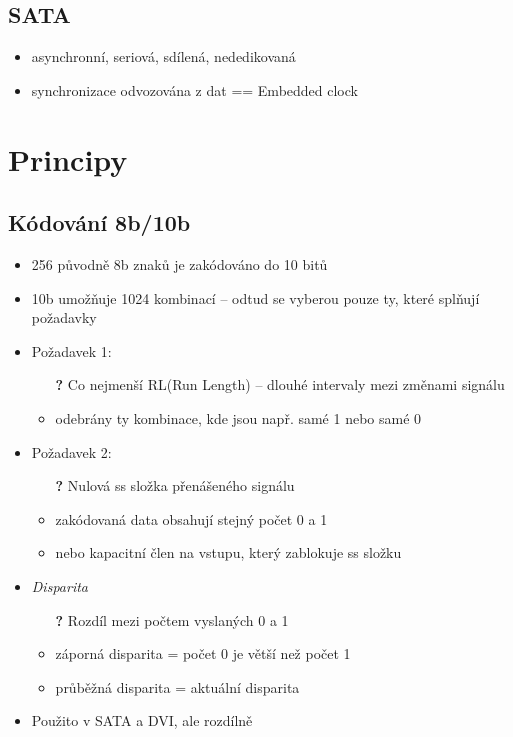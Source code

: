 \documentclass[a5paper,10pt]{article}
\begin{document}
\subsection{SATA}
\begin{itemize}
	\item asynchronní, seriová, sdílená, nededikovaná
	\item synchronizace odvozována z dat == Embedded clock
\end{itemize}



\newpage
\section{Principy}
\subsection{Kódování 8b/10b}
\begin{itemize}
	\item 256 původně 8b znaků je zakódováno do 10 bitů
	\item 10b umožňuje 1024 kombinací -- odtud se vyberou pouze ty, které splňují požadavky
	\item Požadavek 1:
	\begin{itemize}
		\item[\textbf{?}] Co nejmenší RL(Run Length) -- dlouhé intervaly mezi změnami signálu
		\item odebrány ty kombinace, kde jsou např. samé 1 nebo samé 0	
	\end{itemize}	
	\item Požadavek 2:
	\begin{itemize}
		\item[\textbf{?}] Nulová ss složka přenášeného signálu
		\item zakódovaná data obsahují stejný počet 0 a 1
		\item nebo kapacitní člen na vstupu, který zablokuje ss složku
	\end{itemize}
	\item \emph{Disparita}
	\begin{itemize}
		\item[\textbf{?}] Rozdíl mezi počtem vyslaných 0 a 1
		\item záporná disparita = počet 0 je větší než počet 1
		\item průběžná disparita = aktuální disparita	
	\end{itemize}
	
	\item Použito v SATA a DVI, ale rozdílně
\end{itemize}
\end{document}
